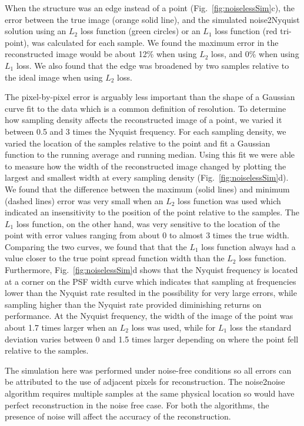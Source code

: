 \documentclass[journal,twoside,web]{ieeecolor}
\begin{document}
When the structure was an edge instead of a point (Fig.~\ref{fig:noiselessSim}c), the error between the true image (orange solid line), and the simulated noise2Nyquist solution using an $L_2$ loss function (green circles) or an $L_1$ loss function (red tri-point), was calculated for each sample. We found the maximum error in the reconstructed image would be about 12\% when using $L_2$ loss, and 0\% when using $L_1$ loss. We also found that the edge was broadened by two samples relative to the ideal image when using $L_2$ loss. 

The pixel-by-pixel error is arguably less important than the shape of a Gaussian curve fit to the data which is a common definition of resolution. To determine how sampling density affects the reconstructed image of a point, we varied it between 0.5 and 3 times the Nyquist frequency. For each sampling density, we varied the location of the samples relative to the point and fit a Gaussian function to the running average and running median. Using this fit we were able to measure how the width of the reconstructed image changed by plotting the largest and smallest width at every sampling density (Fig.~\ref{fig:noiselessSim}d). We found that the difference between the maximum (solid lines) and minimum (dashed lines) error was very small when an $L_2$ loss function was used which indicated an insensitivity to the position of the point relative to the samples. The $L_1$ loss function, on the other hand, was very sensitive to the location of the point with error values ranging from about 0 to almost 3 times the true width. Comparing the two curves, we found that that the $L_1$ loss function always had a value closer to the true point spread function width than the $L_2$ loss function. Furthermore, Fig.~\ref{fig:noiselessSim}d shows that the Nyquist frequency is located at a corner on the PSF width curve which indicates that sampling at frequencies lower than the Nyquist rate resulted in the possibility for very large errors, while sampling higher than the Nyquist rate provided diminishing returns on performance. At the Nyquist frequency, the width of the image of the point was about 1.7 times larger when an $L_2$ loss was used, while for $L_1$ loss the standard deviation varies between 0 and 1.5 times larger depending on where the point fell relative to the samples.

The simulation here was performed under noise-free conditions so all errors can be attributed to the use of adjacent pixels for reconstruction. The noise2noise algorithm requires multiple samples at the same physical location so would have perfect reconstruction in the noise free case. For both the algorithms, the presence of noise will affect the accuracy of the reconstruction.
\end{document}
